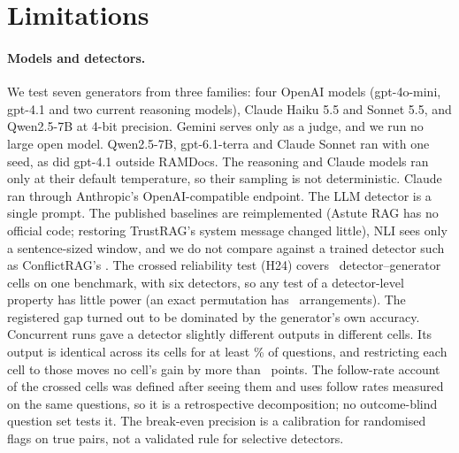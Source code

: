 \section*{Limitations}

\paragraph{Models and detectors.} We test seven generators from three families: four OpenAI models (gpt-4o-mini,
gpt-4.1 and two current reasoning models), Claude Haiku 5.5 and Sonnet 5.5, and Qwen2.5-7B at 4-bit precision. Gemini
serves only as a judge, and we run no large open model. Qwen2.5-7B, gpt-6.1-terra and Claude Sonnet ran with one seed,
as did gpt-4.1 outside RAMDocs. The reasoning and Claude models ran only at their default temperature, so their
sampling is not deterministic. Claude ran through Anthropic's OpenAI-compatible endpoint. The LLM detector is a single
prompt. The published baselines are reimplemented (Astute RAG has no official code; restoring TrustRAG's system message
changed little), NLI sees only a sentence-sized window, and we do not compare against a trained detector such as
ConflictRAG's \citep{wang2026conflictrag}. The crossed reliability test (H24) covers \hTwentyFourCells\
detector--generator cells on one benchmark, with six detectors, so any test of a detector-level property has little
power (an exact permutation has \hRedoNPerm\ arrangements). The registered gap turned out to be dominated by the
generator's own accuracy. Concurrent runs gave a detector slightly different outputs in different cells. Its output is
identical across its cells for at least \frozenShareMin\% of questions, and restricting each cell to those moves no
cell's gain by more than \frozenMaxShift\ points. The follow-rate account of the crossed cells was defined after seeing
them and uses follow rates measured on the same questions, so it is a retrospective decomposition; no outcome-blind
question set tests it. The break-even precision is a calibration for randomised flags on true pairs, not a validated
rule for selective detectors.

